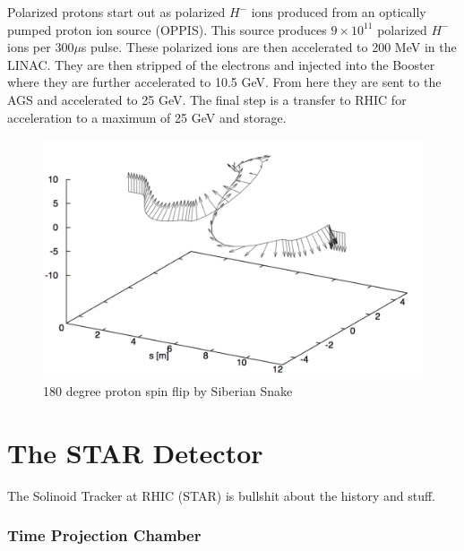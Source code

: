 \documentclass[abstract = on,listof=totoc, bibliography=totoc]{scrreprt}
\begin{document}
Polarized protons start out as polarized $H^-$ ions produced from an optically pumped proton ion source (OPPIS).  This source produces $9\times 10^{11}$ polarized $H^-$ ions per 300$\mu$s pulse. These polarized ions are then accelerated to 200 MeV in the LINAC. They are then stripped of the electrons and injected into the Booster where they are further accelerated to 10.5 GeV. From here they are sent to the AGS and accelerated to 25 GeV. The final step is a transfer to RHIC for acceleration to a maximum of 25 GeV and storage.   \cite{ppCollider}
\begin{figure}
\begin{center}
\includegraphics[width = 1\textwidth]{spinFlipFromPaper}
\caption[Spin flip by Siberian Snake]{180 degree proton spin flip by Siberian Snake}
\label{fig:spinFlip}
\end{center}
\end{figure}



\FloatBarrier

\section{The STAR Detector}
The Solinoid Tracker at RHIC (STAR) is bullshit about the history and stuff.

\subsubsection[TPC]{Time Projection Chamber}
\end{document}

